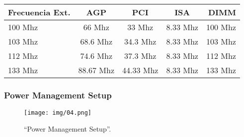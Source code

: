 \documentclass[12pt,oneside,a4paper]{article}
\begin{document}
\begin{description}
					\begin{tabular}{ l | c | c | c | r }
						\hline
	Frecuencia Ext. &      AGP         &    PCI    &    ISA    & DIMM \\ 
						\hline
	100 Mhz         &      66 Mhz      &  33 Mhz   &  8.33 Mhz & 100 Mhz \\ 
	103 Mhz         &     68.6 Mhz     & 34.3 Mhz  &  8.33 Mhz & 103 Mhz \\
	112 Mhz         &     74.6 Mhz     & 37.3 Mhz  &  8.33 Mhz & 112 Mhz \\ 
	133 Mhz         &    88.67 Mhz     & 44.33 Mhz &  8.33 Mhz & 133 Mhz \\ 
						\hline
					\end{tabular}
					
			\end{description}
			\newpage
			
		\subsubsection{Power Management Setup}{\label{sub:power management setup}}
			\begin{figure}[H]
				\centering
					\texttt{[image: img/04.png]}
				\caption{``Power Management Setup''.}
			\end{figure}
				
\end{document}
